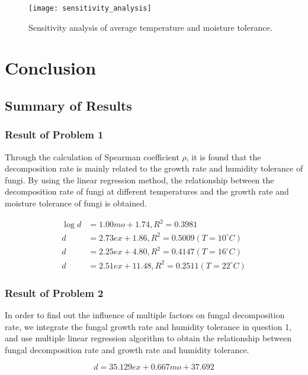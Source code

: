 \documentclass{mcmthesis}
\begin{document}
\begin{figure}[H]
  \small
  \centering
  \texttt{[image: sensitivity\_analysis]}
  \caption{Sensitivity analysis of average temperature and moisture tolerance.}
  \label{sensitivity_analysis}
\end{figure}

\section{Conclusion}

\subsection{Summary of Results}

\subsubsection*{Result of Problem 1}

Through the calculation of Spearman coefficient $ \rho $, it is found that the decomposition rate  is mainly related to the growth rate and humidity tolerance of fungi. By using the linear regression method, the relationship between the decomposition rate of fungi at different temperatures and the growth rate and moisture tolerance of fungi is obtained.

\begin{equation}
  \begin{split}
    \log {d}&=1.00mo+1.74,R^2=0.3981 \\
    d&=2.73ex+1.86,R^2=0.5009 (T=10^{\circ}C) \\
    d&=2.25ex+4.80,R^2=0.4147 (T=16^{\circ}C) \\
    d&=2.51ex+11.48,R^2=0.2511 (T=22^{\circ}C)
  \end{split}
\end{equation}

\subsubsection*{Result of Problem 2}

In order to find out the influence of multiple factors on fungal decomposition rate, we integrate the fungal growth rate and humidity tolerance in question 1, and use multiple linear regression algorithm to obtain the relationship between fungal decomposition rate and growth rate and humidity tolerance.

\begin{equation}
  d = 35.129ex +0.667mo + 37.692
\end{equation}
\end{document}
